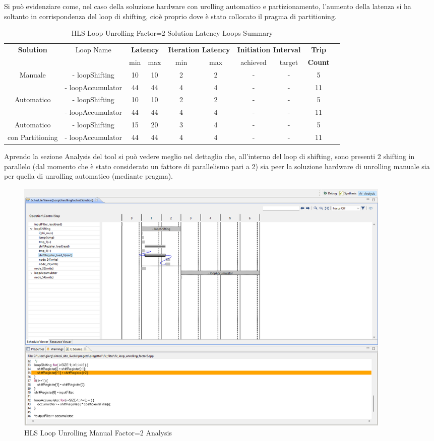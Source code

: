 Si può evidenziare come, nel caso della soluzione hardware con urolling automatico e partizionamento, l'aumento della latenza si ha soltanto in corrispondenza del loop di shifting, cioè proprio dove è stato collocato il pragma di partitioning.

\begin{table}[H]
    \centering
    \begin{tabular}{|c|c|c|c|c|c|c|c|c|c|}
        \hline
        \multicolumn{1}{|c|}{\textbf{Solution}} & \multicolumn{1}{|c|}{Loop Name} & \multicolumn{2}{|c|}{\textbf{Latency}} & \multicolumn{2}{c|}{\textbf{Iteration Latency}} & \multicolumn{2}{c|}{\textbf{Initiation Interval}} & \multicolumn{1}{c|}{\textbf{Trip}}  \\
        &  & min & max & min & max & achieved & target & \textbf{Count} \\
        \hline
        Manuale & - loopShifting & 10 & 10 & 2 & 2 & - & - & 5 \\
        & - loopAccumulator & 44 & 44 & 4 & 4 & - & - & 11 \\
        \hline
        Automatico & - loopShifting & 10 & 10 & 2 & 2 & - & - & 5 \\
        & - loopAccumulator & 44 & 44 & 4 & 4 & - & - & 11 \\
        \hline
        Automatico  & - loopShifting & 15 & 20 & 3 & 4 & - & - & 5 \\
        con Partitioning & - loopAccumulator & 44 & 44 & 4 & 4 & - & - & 11 \\
        \hline
    \end{tabular}
    \caption{HLS Loop Unrolling Factor=2 Solution Latency Loops Summary }
    \label{tab:hls-loop-unrolling-factor2-solution-loop-summary}
\end{table}

Aprendo la sezione Analysis del tool si può vedere meglio nel dettaglio che, all'interno del loop di shifting, sono presenti 2 shifting in parallelo (dal momento che è stato considerato un fattore di parallelismo pari a 2) sia peer la soluzione hardware di unrolling manuale sia per quella di unrolling automatico (mediante pragma).

\begin{figure}[H]
    \centering
    \includegraphics[width=0.9\textwidth]{solutions/loop_unrolling/factor2/loopunrollingmanual2.png}
    \caption{HLS Loop Unrolling Manual Factor=2 Analysis}
\end{figure}

